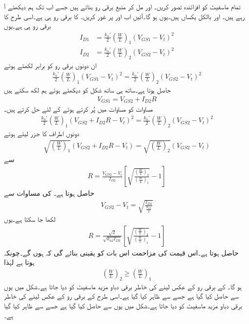 تمام ماسفیٹ کو افزائندہ تصور کریں۔ اور  مل کر منبع برقی رو بناتے ہیں جسے اب تک ہم دیکھتے آ رہے ہیں۔ اور  بالکل یکساں ہیں۔یوں  ہو گا۔آئیں اب  اور  پر غور کریں۔ کا برقی رو  ہی ہے۔اسی طرح  کا برقی رو  ہی ہے۔یوں
\begin{align*}
I_{D1}&=\frac{k_n'}{2} \left(\frac{W}{L} \right)_1 \left(V_{GS1}-V_t \right)^2\\
I_{D2}&=\frac{k_n'}{2} \left(\frac{W}{L} \right)_2 \left(V_{GS2}-V_t \right)^2
\end{align*} 
ان دونوں برقی رو کو برابر لکھتے ہوئے
\begin{align}\label{مساوت_تفرقی_منبع_سے_پاک_کے_برقی_رو}
\frac{k_n'}{2} \left(\frac{W}{L} \right)_1 \left(V_{GS1}-V_t \right)^2=\frac{k_n'}{2} \left(\frac{W}{L} \right)_2 \left(V_{GS2}-V_t \right)^2
\end{align}
حاصل ہوتا ہے۔ساتھ ہی ساتھ شکل کو دیکھتے ہوئے ہم لکھ سکتے ہیں
\begin{align}\label{مساوات_تفرقی_منبع_سے_پاک_کے_تعلق}
V_{GS1}=V_{GS2}+I_{D2} R
\end{align}
مساوات  کو مساوات  میں پُر کرتے ہوئے  کے لئے حل کرتے ہیں۔
\begin{align*}
\frac{k_n'}{2} \left(\frac{W}{L} \right)_1 \left(V_{GS2}+I_{D2} R-V_t \right)^2=\frac{k_n'}{2} \left(\frac{W}{L} \right)_2 \left(V_{GS2}-V_t \right)^2
\end{align*}
دونوں اطراف کا  جزر    لیتے ہوئے
\begin{align*}
\sqrt{\left(\frac{W}{L} \right)_1} \left(V_{GS2}+I_{D2} R-V_t \right)=\sqrt{\left(\frac{W}{L} \right)_2} \left(V_{GS2}-V_t \right)
\end{align*}
سے
\begin{align*}
R=\frac{V_{GS2}-V_t}{I_{D2}} \left[ \sqrt{\frac{\left(\frac{W}{L} \right)_2}{\left(\frac{W}{L} \right)_1}} -1\right]
\end{align*}
حاصل ہوتا ہے۔ کی مساوات سے 
\begin{align*}
V_{GS2}-V_t=\sqrt{\frac{I_{D2}}{\frac{k_{n2}}{2}}}
\end{align*}
لکھا جا سکتا ہے۔یوں
\begin{align}
R=\frac{\sqrt{2}}{\sqrt{k_{n2} I_{D2}}} \left[ \sqrt{\frac{\left(\frac{W}{L} \right)_2}{\left(\frac{W}{L} \right)_1}} -1\right]
\end{align}
 حاصل ہوتا ہے۔اس قیمت کی مزاحمت اس بات کو یقینی بنائے گی کہ  ہوں گے۔چونکہ  ہوتا ہے لہٰذا
\begin{align*}
\left(\frac{W}{L} \right)_2 \ge \left(\frac{W}{L} \right)_1
\end{align*}
ہو گا۔ کے برقی رو کے عکس لینے کی خاطر   برقی دباو مزید ماسفیٹ کو دیا جاتا ہے۔شکل میں یوں  سے  حاصل کیا گیا ہے جسے  سے ظاہر کیا گیا ہے۔اسی طرح   کے برقی رو کے عکس لینے کی خاطر   برقی دباو مزید ماسفیٹ کو دیا جاتا ہے۔شکل میں یوں  سے  حاصل کیا گیا ہے جسے  سے ظاہر کیا گیا ہے۔

